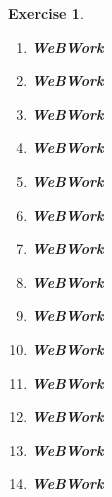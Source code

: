 \documentclass[a4paper,12pt]{report}
\newcounter{statement}
\numberwithin{statement}{chapter}
\newtheorem{ex}[statement]{\bf Exercise}
\numberwithin{equation}{chapter}
\numberwithin{section}{chapter}
\numberwithin{subsection}{section}
\begin{document}
\begin{ex}
\begin{enumerate}
\item 

{\bf WeBWork}

\item 

{\bf WeBWork}

\item 

{\bf WeBWork}

\item 

{\bf WeBWork}

\item 

{\bf WeBWork}

\item 

{\bf WeBWork}

\item 

{\bf WeBWork}

\item 

{\bf WeBWork}

\item 

{\bf WeBWork}

\item 

{\bf WeBWork}

\item 

{\bf WeBWork}

\item 

{\bf WeBWork}

\item 

{\bf WeBWork}

\item 

{\bf WeBWork}
\end{enumerate}
\end{ex}
\end{document}
